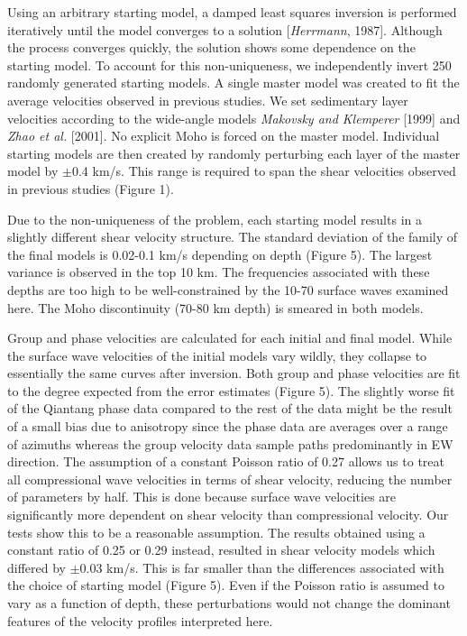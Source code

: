 \documentclass[12pt]{article}
\begin{document}
Using an arbitrary starting model, a damped least squares inversion is performed iteratively until the model converges to a 
solution [{\it Herrmann}, 1987].  Although the process converges quickly, the solution shows some dependence on the starting model.  
To account for this non-uniqueness, we independently invert 250 randomly generated starting models.  A single master model 
was created to fit the average velocities observed in previous studies.  We set sedimentary layer 
velocities according to the wide-angle models {\it 
Makovsky and Klemperer} [1999] and {\it Zhao et 
al.} [2001].  No explicit Moho is forced on the master model.  Individual starting models are then created 
by randomly perturbing each layer of the master model by $\pm$0.4 km/s.  This range is required to span the 
shear velocities observed in previous studies (Figure 1).

Due to the non-uniqueness of the problem, each starting model results in a slightly different shear 
velocity structure.  The standard deviation of the family of the final models is 0.02-0.1 km/s depending on 
depth (Figure 5).  The largest variance is observed in the top 10 km.  The frequencies associated with 
these depths are too high to be well-constrained by the 10-70 surface waves examined here. The Moho discontinuity (70-80 km depth) is smeared in both models. 

Group and phase velocities are calculated for each initial and final model.  While the surface wave 
velocities of the initial models vary wildly, they collapse to essentially the same curves after inversion. 
Both group and phase velocities are fit to the degree expected from the error
  estimates (Figure 5).   The slightly worse fit of the Qiantang phase data
  compared to the rest of the data might be the result of a small bias due to
  anisotropy since the phase data are averages over a range of azimuths whereas the
  group velocity data sample paths predominantly in EW direction. 
The assumption of a constant Poisson ratio of 0.27 allows us to treat all compressional wave velocities in 
terms of shear velocity, reducing the number of parameters by half. This is done because surface wave 
velocities are significantly more dependent on shear velocity than compressional velocity.  Our tests show 
this to be a reasonable assumption.  The results obtained using a constant ratio of 0.25 or 0.29 instead, 
resulted in shear velocity models which differed by $\pm$0.03 km/s.  This is far smaller than the differences 
associated with the choice of starting model (Figure 5).  Even if the Poisson ratio is assumed to vary as a 
function of depth, these perturbations would not change the dominant features of the 
velocity profiles interpreted here. 
\end{document}
